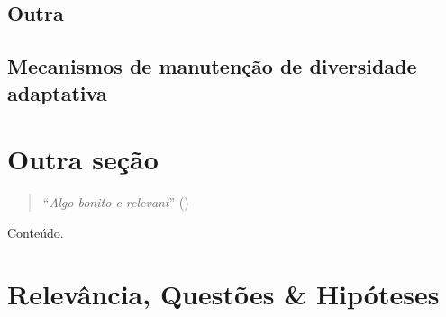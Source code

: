 \begin{refsection}
\subsection{Outra}%
\subsection{Mecanismos de manutenção de diversidade adaptativa}%
\section{Outra seção} %
\medskip
\begin{quotation}
\enquote{\emph{Algo bonito e relevant}}   (\cite{})
\end{quotation}
\medskip
Conteúdo.
\newpage
\section{Relevância, Questões \& Hipóteses}%
%

\end{refsection}
